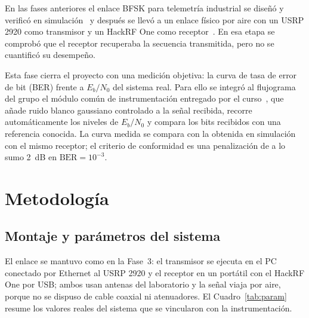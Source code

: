 \documentclass[conference]{IEEEtran}
\begin{document}
En las fases anteriores el enlace BFSK para telemetría industrial se diseñó y verificó en simulación~\cite{guia1,guia2} y después se llevó a un enlace físico por aire con un USRP 2920 como transmisor y un HackRF One como receptor~\cite{guia3}. En esa etapa se comprobó que el receptor recuperaba la secuencia transmitida, pero no se cuantificó su desempeño.

Esta fase cierra el proyecto con una medición objetiva: la curva de tasa de error de bit (BER) frente a $E_b/N_0$ del sistema real. Para ello se integró al flujograma del grupo el módulo común de instrumentación entregado por el curso~\cite{guia4,guia4a}, que añade ruido blanco gaussiano controlado a la señal recibida, recorre automáticamente los niveles de $E_b/N_0$ y compara los bits recibidos con una referencia conocida. La curva medida se compara con la obtenida en simulación con el mismo receptor; el criterio de conformidad es una penalización de a lo sumo 2~dB en $\text{BER} = 10^{-3}$.

\section{Metodología}

\subsection{Montaje y parámetros del sistema}

El enlace se mantuvo como en la Fase~3: el transmisor se ejecuta en el PC conectado por Ethernet al USRP 2920 y el receptor en un portátil con el HackRF One por USB; ambos usan antenas del laboratorio y la señal viaja por aire, porque no se dispuso de cable coaxial ni atenuadores. El Cuadro~\ref{tab:param} resume los valores reales del sistema que se vincularon con la instrumentación.
\end{document}
